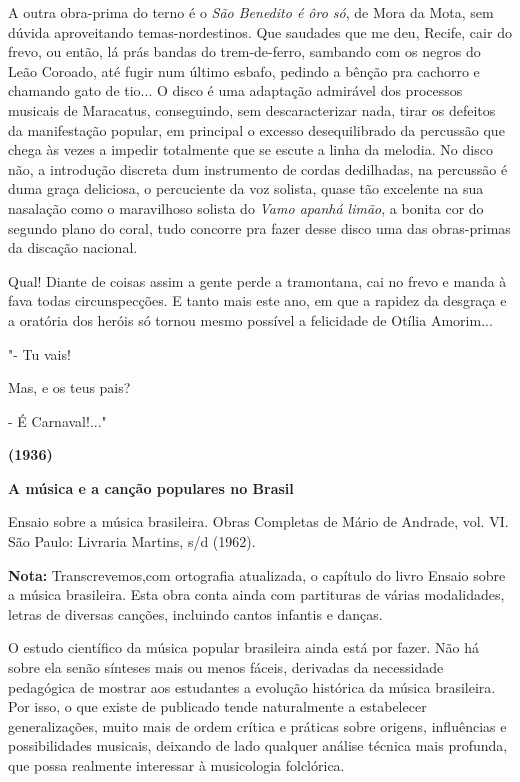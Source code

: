 A outra obra-prima do terno é o \emph{São Benedito é ôro só}, de Mora da
Mota, sem dúvida aproveitando temas-nordestinos. Que saudades que me
deu, Recife, cair do frevo, ou então, lá prás bandas do trem-de-ferro,
sambando com os negros do Leão Coroado, até fugir num último esbafo,
pedindo a bênção pra cachorro e chamando gato de tio... O disco é uma
adaptação admirável dos processos musicais de Maracatus, conseguindo,
sem descaracterizar nada, tirar os defeitos da manifestação popular, em
principal o excesso desequilibrado da percussão que chega às vezes a
impedir totalmente que se escute a linha da melodia. No disco não, a
introdução discreta dum instrumento de cordas dedilhadas, na percussão é
duma graça deliciosa, o percuciente da voz solista, quase tão excelente
na sua nasalação como o maravilhoso solista do \emph{Vamo apanhá limão},
a bonita cor do segundo plano do coral, tudo concorre pra fazer desse
disco uma das obras-primas da discação nacional.

Qual! Diante de coisas assim a gente perde a tramontana, cai no frevo e
manda à fava todas circunspecções. E tanto mais este ano, em que a
rapidez da desgraça e a oratória dos heróis só tornou mesmo possível a
felicidade de Otília Amorim...

"- Tu vais!

Mas, e os teus pais?

- É Carnaval!..."

\textbf{(1936)}

\protect\hypertarget{sgjwyv12hyi8}{}{}\textbf{A música e a canção
populares no Brasil}

Ensaio sobre a música brasileira. Obras Completas de Mário de Andrade,
vol. VI. São Paulo: Livraria Martins, s/d (1962).

\textbf{Nota:} Transcrevemos,com ortografia atualizada, o capítulo do
livro Ensaio sobre a música brasileira. Esta obra conta ainda com
partituras de várias modalidades, letras de diversas canções, incluindo
cantos infantis e danças.

O estudo científico da música popular brasileira ainda está por fazer.
Não há sobre ela senão sínteses mais ou menos fáceis, derivadas da
necessidade pedagógica de mostrar aos estudantes a evolução histórica da
música brasileira. Por isso, o que existe de publicado tende
naturalmente a estabelecer generalizações, muito mais de ordem crítica e
práticas sobre origens, influências e possibilidades musicais, deixando
de lado qualquer análise técnica mais profunda, que possa realmente
interessar à musicologia folclórica.

